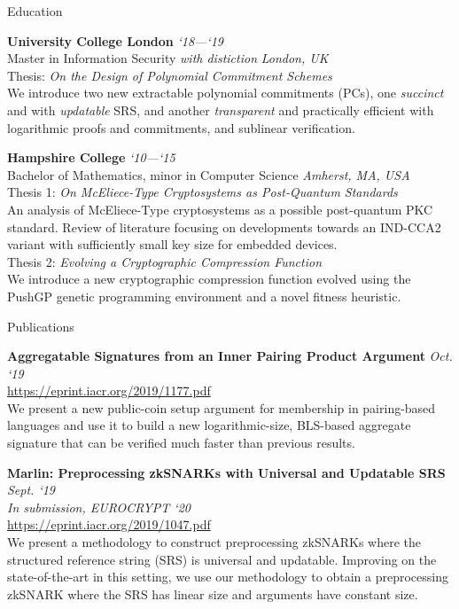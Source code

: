 \documentclass{cv}
\begin{document}
\begin{rSection}{Education}

\textbf{University College London} \hfill \emph{`18---`19}  \\
Master in Information Security \emph{with distiction} \hfill \emph{London, UK} \\
Thesis: \emph{On the Design of Polynomial Commitment Schemes} \\
{\small We introduce two new extractable polynomial commitments (PCs), one \emph{succinct} and with \emph{updatable} SRS, and another \emph{transparent} and practically efficient with logarithmic proofs and commitments, and sublinear verification.}

\textbf{Hampshire College} \hfill \emph{`10---`15} \\
Bachelor of Mathematics, minor in Computer Science \hfill \emph{Amherst, MA, USA} \\
Thesis 1: \emph{On McEliece-Type Cryptosystems as Post-Quantum Standards} \\
{\small An analysis of McEliece-Type cryptosystems as a possible post-quantum PKC standard. Review of literature focusing on developments towards an IND-CCA2 variant with sufficiently small key size for embedded devices.} \\
Thesis 2: \emph{Evolving a Cryptographic Compression Function} \\
{\small We introduce a new cryptographic compression function evolved using the PushGP genetic programming environment and a novel fitness heuristic.}

\end{rSection}

\begin{rSection}{Publications}

\textbf{Aggregatable Signatures from an Inner Pairing Product Argument} \hfill \emph{Oct. `19} \\
\url{https://eprint.iacr.org/2019/1177.pdf} \\
{\small We present a new public-coin setup argument for membership in pairing-based languages and use it to build a new logarithmic-size, BLS-based aggregate signature that can be verified much faster than previous results.}

\textbf{Marlin: Preprocessing zkSNARKs with Universal and Updatable SRS} \hfill \emph{Sept. `19} \\
\emph{In submission, EUROCRYPT `20} \\
\url{https://eprint.iacr.org/2019/1047.pdf} \\
{\small We present a methodology to construct preprocessing zkSNARKs where the structured reference string (SRS) is universal and updatable. Improving on the state-of-the-art in this setting, we use our methodology to obtain a preprocessing zkSNARK where the SRS has linear size and arguments have constant size.}

\end{rSection}
\end{document}

